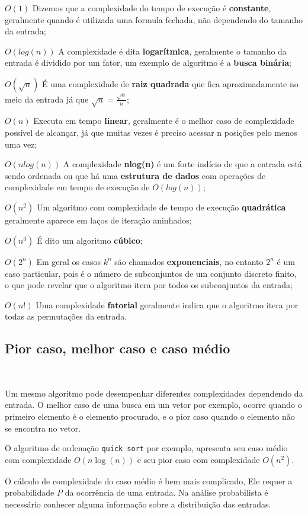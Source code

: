 $O(1)$ Dizemos que a complexidade do tempo de execução é \textbf{constante}, geralmente quando é utilizada uma formula fechada, não dependendo do tamanho da entrada;

$O(log(n))$ A complexidade é dita \textbf{logarítmica}, geralmente o tamanho da entrada é dividido por um fator, um exemplo de algoritmo é a \textbf{busca binária};

$O(\sqrt{n})$ É uma complexidade de \textbf{raiz quadrada} que fica aproximadamente no meio da entrada já que $\sqrt{n} = \frac{\sqrt{n}}{n}$;

$O(n)$ Executa em tempo \textbf{linear}, geralmente é o melhor caso de complexidade possível de alcançar, já que muitas vezes é preciso acessar n posições pelo menos uma vez;

$O(nlog(n))$ A complexidade \textbf{nlog(n)} é um forte indício de que a entrada está sendo ordenada ou que há uma \textbf{estrutura de dados} com operações de complexidade em tempo de execução de $O(log(n))$;

$O(n^2)$ Um algoritmo com complexidade de tempo de execução \textbf{quadrática} geralmente aparece em laços de iteração aninhados; 

$O(n^3)$ É dito um algoritmo \textbf{cúbico};

$O(2^n)$ Em geral os casos $k^n$ são chamados \textbf{exponenciais}, no entanto $2^n$ é um caso particular, pois é o número de subconjuntos de um conjunto discreto finito, o que pode revelar que o algoritmo itera por todos os subconjuntos da entrada;

$O(n!)$ Uma complexidade \textbf{fatorial} geralmente indica que o algoritmo itera por todas as permutações da entrada.

\subsection{Pior caso, melhor caso e caso médio}
\

Um mesmo algoritmo pode desempenhar diferentes complexidades dependendo da entrada. O melhor caso de uma busca em um vetor por exemplo, ocorre quando o primeiro elemento é o elemento procurado, e o pior caso quando o elemento não se encontra no vetor.

O algoritmo de ordenação \texttt{quick sort} por exemplo, apresenta seu caso médio com complexidade $O(n\log(n))$ e seu pior caso com complexidade $O(n^2)$.

O cálculo de complexidade do caso médio é bem mais complicado, Ele requer a probabilidade $P$ da ocorrência de uma entrada. Na análise probabilista é necessário conhecer alguma informação sobre a distribuição das entradas.

